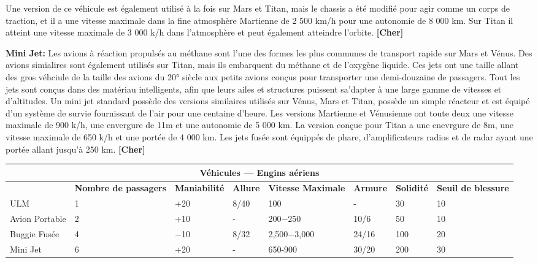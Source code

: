 Une version de ce véhicule est également utilisé à la fois sur Mars et Titan, mais le chassis a été modifié pour agir comme un corps de traction, et il a une vitesse maximale dans la fine atmosphère Martienne de 2 500 km/h pour une autonomie de 8 000 km. Sur Titan il atteint une vitesse maximale de 3 000 k/h dans l'atmosphère et peut également atteindre l'orbite. \textbf{[Cher]} 

\textbf{Mini Jet:} Les avions à réaction propulsés au méthane sont l'une des formes les plus communes de transport rapide sur Mars et Vénus. Des avions simialires sont également utilisés sur Titan, mais ils embarquent du méthane et de l'oxygène liquide. Ces jets ont une taille allant des gros véhciule de la taille des avions du 20° siècle aux petits avions conçus pour transporter une demi-douzaine de passagers. Tout les jets sont conçus dans des matériau intelligents, afin que leurs ailes et structures puissent sa'dapter à une large gamme de vitesses et d'altitudes. Un mini jet standard possède des versions similaires utilisés sur Vénus, Mars et Titan, possède un simple réacteur et est équipé d'un système de survie fournissant de l'air pour une centaine d'heure. Les versions Martienne et Vénusienne ont toute deux une vitesse maximale de 900 k/h, une envergure de 11m et une autonomie de 5 000 km. La version conçue pour Titan a une enevrgure de 8m, une vitesse maximale de 650 k/h et une portée de 4 000 km. Les jets fusée sont équippés de phare, d'amplificateurs radios et de radar ayant une portée allant jusqu'à 250 km. \textbf{[Cher]} 

\begin{table} \begin{tabularx}{\textwidth}{|X|X|X|X|X|l|l|X|} \hline

\multicolumn{8}{|c|}{\textbf{Véhicules --- Engins aériens}} \\ \hline

&\textbf{Nombre de passagers}	&\textbf{Maniabilité}	&\textbf{Allure}	&\textbf{Vitesse Maximale}	&\textbf{Armure}	&\textbf{Solidité}	&\textbf{Seuil de blessure} \\ \hline

ULM	&1	&+20	&8/40	&100	&- &30	&10 \\ \hline

Avion Portable	&2	&+10	&- &200$-$250	&10/6	&50	&10 \\ \hline

Buggie Fusée	&4	&$-$10	&8/32	&2,500$-$3,000	&24/16	&100	&20 \\ \hline

Mini Jet	&6	&+20	&- &650-900	&30/20	&200	&30 \\ \hline

\end{tabularx} \label{tab:aircraft} \end{table} 

